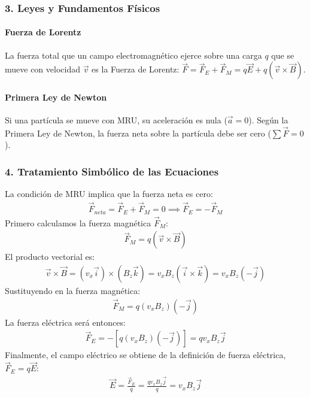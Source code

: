 \subsubsection*{3. Leyes y Fundamentos Físicos}
\paragraph*{Fuerza de Lorentz}
La fuerza total que un campo electromagnético ejerce sobre una carga $q$ que se mueve con velocidad $\vec{v}$ es la Fuerza de Lorentz: $\vec{F} = \vec{F}_E + \vec{F}_M = q\vec{E} + q(\vec{v} \times \vec{B})$.

\medskip
\paragraph*{Primera Ley de Newton}
Si una partícula se mueve con MRU, su aceleración es nula ($\vec{a}=0$). Según la Primera Ley de Newton, la fuerza neta sobre la partícula debe ser cero ($\sum \vec{F} = 0$).
\subsubsection*{4. Tratamiento Simbólico de las Ecuaciones}
La condición de MRU implica que la fuerza neta es cero:
\begin{gather}
    \vec{F}_{neta} = \vec{F}_E + \vec{F}_M = 0 \implies \vec{F}_E = -\vec{F}_M
\end{gather}
Primero calculamos la fuerza magnética $\vec{F}_M$:
\begin{gather}
    \vec{F}_M = q(\vec{v} \times \vec{B})
\end{gather}
El producto vectorial es:
\begin{gather}
    \vec{v} \times \vec{B} = (v_x \vec{i}) \times (B_z \vec{k}) = v_x B_z (\vec{i} \times \vec{k}) = v_x B_z (-\vec{j})
\end{gather}
Sustituyendo en la fuerza magnética:
\begin{gather}
    \vec{F}_M = q (v_x B_z) (-\vec{j})
\end{gather}
La fuerza eléctrica será entonces:
\begin{gather}
    \vec{F}_E = - [q (v_x B_z) (-\vec{j})] = q v_x B_z \vec{j}
\end{gather}
Finalmente, el campo eléctrico se obtiene de la definición de fuerza eléctrica, $\vec{F}_E = q \vec{E}$:
\begin{gather}
    \vec{E} = \frac{\vec{F}_E}{q} = \frac{q v_x B_z \vec{j}}{q} = v_x B_z \vec{j}
\end{gather}

